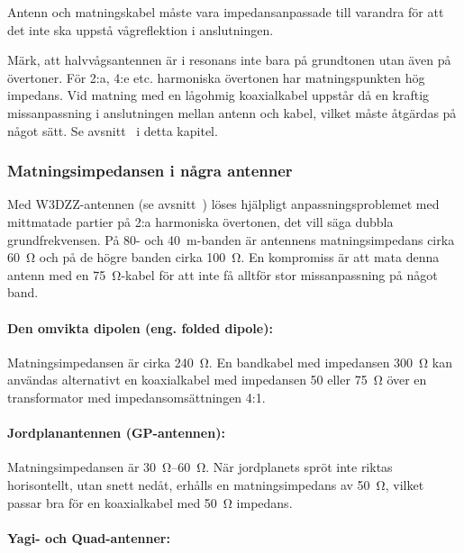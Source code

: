 Antenn och matningskabel måste vara impedansanpassade till varandra
för att det inte ska uppstå vågreflektion i anslutningen.

Märk, att halvvågsantennen är i resonans inte bara på grundtonen utan även på
övertoner.
För 2:a, 4:e etc. harmoniska övertonen har matningspunkten hög impedans.
Vid matning med en lågohmig koaxialkabel uppstår då en kraftig missanpassning i
anslutningen mellan antenn och kabel, vilket måste åtgärdas på något sätt.
Se avsnitt~ i detta kapitel.

\subsubsection{Matningsimpedansen i några antenner}

Med W3DZZ-antennen (se avsnitt~) löses hjälpligt anpassningsproblemet
med mittmatade partier på 2:a harmoniska övertonen, det vill säga dubbla
grundfrekvensen.
På 80- och \qty{40}{\metre}-banden är antennens matningsimpedans cirka
\qty{60}{\ohm} och på de högre banden cirka \qty{100}{\ohm}.
En kompromiss är att mata denna antenn med en \qty{75}{\ohm}-kabel för att inte
få alltför stor missanpassning på något band.

\paragraph{Den omvikta dipolen (eng. folded dipole):}

Matningsimpedansen är cirka \qty{240}{\ohm}.
En bandkabel med impedansen \qty{300}{\ohm} kan användas alternativt en
koaxialkabel med impedansen 50 eller \qty{75}{\ohm} över en transformator med
impedansomsättningen 4:1.

\paragraph{Jordplanantennen (GP-antennen):}

Matningsimpedansen är \SIrange{30}{60}{\ohm}.
När jordplanets spröt inte riktas horisontellt, utan snett nedåt, erhålls en
matningsimpedans av \qty{50}{\ohm}, vilket passar bra för en koaxialkabel med
\qty{50}{\ohm} impedans.

\paragraph{Yagi- och Quad-antenner:}

